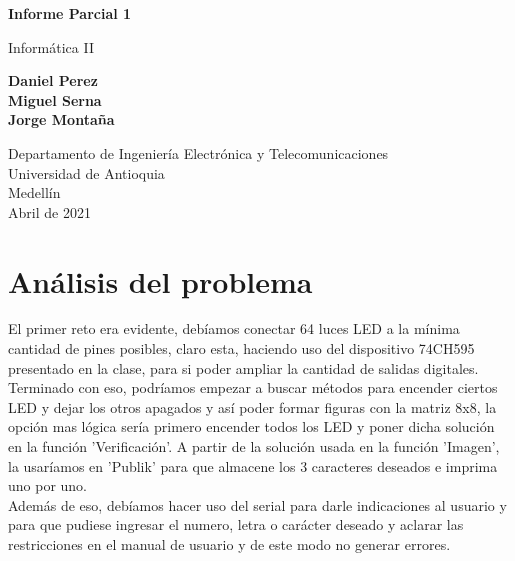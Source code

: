 \documentclass{article}
\begin{document}
\begin{titlepage}
    \begin{center}
        \vspace*{1cm}
            
        \Huge
        \textbf{Informe Parcial 1}
            
        \vspace{0.5cm}
        \LARGE
        Informática II
            
        \vspace{1.5cm}
            
        \textbf{Daniel Perez\\Miguel Serna\\Jorge Montaña}
            
        \vfill
            
        \vspace{0.8cm}
            
        \Large
        Departamento de Ingeniería Electrónica y Telecomunicaciones\\
        Universidad de Antioquia\\
        Medellín\\
        Abril de 2021
            
    \end{center}
\end{titlepage}

\tableofcontents

\section{Análisis del problema}
El primer reto era evidente, debíamos conectar 64 luces LED a la mínima cantidad de pines posibles, claro esta, haciendo uso del dispositivo 74CH595 presentado en la clase, para si poder ampliar la cantidad de salidas digitales.\\

Terminado con eso, podríamos empezar a buscar métodos para encender ciertos LED y dejar los otros apagados y así poder formar figuras con la matriz 8x8, la opción mas lógica sería primero encender todos los LED y poner dicha solución en la función 'Verificación'. A partir de la solución usada en la función 'Imagen', la usaríamos en 'Publik' para que almacene los 3 caracteres deseados e imprima uno por uno.\\

Además de eso, debíamos hacer uso del serial para darle indicaciones al usuario y para que pudiese ingresar el numero, letra o carácter deseado y  aclarar las restricciones en el manual de usuario y de este modo no generar errores.
\end{document}

